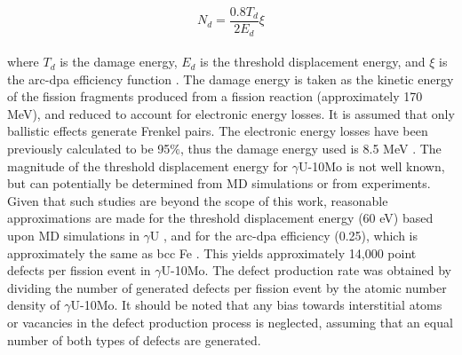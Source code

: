 \documentclass[preprint,12pt]{elsarticle}
\begin{document}
\begin{equation}
N_{d} = \frac{0.8T_{d}}{2E_{d}}\xi
\end{equation}
\\
\noindent where $T_{d}$ is the damage energy, $E_{d}$ is the threshold displacement energy, and $\xi$ is the arc-dpa efficiency function \cite{nordlund2018improving}. The damage energy is taken as the kinetic energy of the fission fragments produced from a fission reaction (approximately 170 MeV), and reduced to account for electronic energy losses. It is assumed that only ballistic effects generate Frenkel pairs. The electronic energy losses have been previously calculated to be 95$\%$, thus the damage energy used is 8.5 MeV \cite{beeler2021radiation}. The magnitude of the threshold displacement energy for $\gamma$U-10Mo is not well known, but can potentially be determined from MD simulations or from experiments. Given that such studies are beyond the scope of this work, reasonable approximations are made for the threshold displacement energy (60 eV) based upon MD simulations in $\gamma$U \cite{beeler2018calculation}, and for the arc-dpa efficiency (0.25), which is approximately the same as bcc Fe \cite{nordlund2018improving}. This yields approximately 14,000 point defects per fission event in $\gamma$U-10Mo. The defect production rate was obtained by dividing the number of generated defects per fission event by the atomic number density of $\gamma$U-10Mo. It should be noted that any bias towards interstitial atoms or vacancies in the defect production process is neglected, assuming that an equal number of both types of defects are generated.\\
\end{document}
